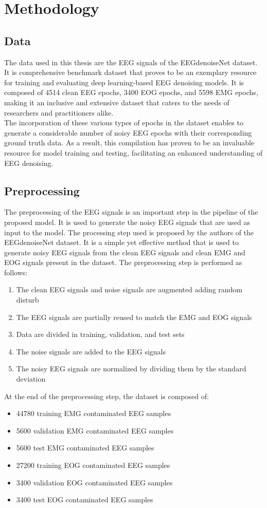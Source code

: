 \documentclass[a4paper]{sapthesis}
\begin{document}
\chapter{Methodology}
\section{Data}\label{sec:data}
The data used in this thesis are the EEG signals of the EEGdenoiseNet 
dataset\cite{EEGdenoiseNet}. It is comprehensive benchmark dataset
 that proves to be an exemplary resource for training and evaluating
  deep learning-based EEG denoising models. It is composed of 4514 clean 
  EEG epochs, 3400 EOG epochs, and 5598 EMG epochs, making it an inclusive 
  and extensive dataset that caters to the needs of researchers and
 practitioners alike.\newline \\
The incorporation of these various types of epochs in the dataset
enables to generate a considerable number of noisy EEG epochs
with their corresponding ground truth data. As a result, this compilation 
has proven to be an invaluable resource for model training and testing,
 facilitating an enhanced understanding of EEG denoising.
\section{Preprocessing}
The preprocessing of the EEG signals is an important step in the
pipeline of the proposed model. It is used to generate the noisy EEG
signals that are used as input to the model.
The processing step used is proposed by the authors of the EEGdenoiseNet
dataset\cite{EEGdenoiseNet}. It is a simple yet effective method that
is used to generate noisy EEG signals from the clean EEG signals and clean 
EMG and EOG signals present in the dataset.
The preprocessing step is performed as follows:
\begin{enumerate}
\item The clean EEG signals and noise signals are augmented adding 
random disturb
\item The EEG signals are partially reused to match the EMG and EOG
signals
\item Data are divided in training, validation, and test sets
\item The noise signals are added to the EEG signals
\item The noisy EEG signals are normalized by dividing them by the
standard deviation
\end{enumerate}
At the end of the preprocessing step, the dataset is composed of:
\begin{itemize}
\item 44780 training EMG contaminated EEG samples
\item 5600 validation EMG contaminated EEG samples
\item 5600 test EMG contaminated EEG samples
\item 27200 training EOG contaminated EEG samples
\item 3400 validation EOG contaminated EEG samples
\item 3400 test EOG contaminated EEG samples
\end{itemize}
\end{document}
